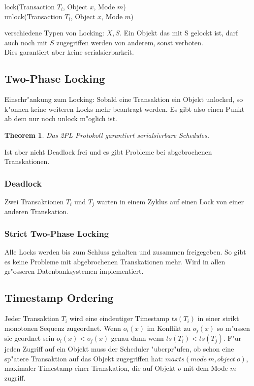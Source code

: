 \documentclass[german, 10pt, a4paper, twocolumn]{scrartcl}
\newtheorem{theorem}{Theorem}
\theoremstyle{definition}
\theoremstyle{remark}
\theoremstyle{example}
\begin{document}
lock(Transaction $T_i$, Object $x$, Mode $m$)\\
unlock(Transaction $T_i$, Object $x$, Mode $m$)

verschiedene Typen von Locking: $X, S$. Ein Objekt das mit S gelockt ist, darf auch noch mit $S$ zugegriffen werden von anderem, sonst verboten.\\

Dies garantiert aber keine serialsierbarkeit.

\subsection{Two-Phase Locking}

Einschr"ankung zum Locking: Sobald eine Transaktion ein Objekt unlocked, so k"onnen keine weiteren Locks mehr beantragt werden. Es gibt also einen Punkt ab dem nur noch unlock m"oglich ist.

\begin{theorem}
	Das 2PL Protokoll garantiert serialsierbare Schedules.
\end{theorem}

Ist aber nicht Deadlock frei und es gibt Probleme bei abgebrochenen Transkationen.

\subsubsection{Deadlock}

Zwei Transaktionen $T_i$ und $T_j$ warten in einem Zyklus auf einen Lock von einer anderen Transkation.

\subsubsection{Strict Two-Phase Locking}

Alle Locks werden bis zum Schluss gehalten und zusammen freigegeben. So gibt es keine Probleme mit abgebrochenen Transkationen mehr. Wird in allen gr"osseren Datenbanksystemen implementiert.

\subsection{Timestamp Ordering}

Jeder Transaktion $T_i$ wird eine eindeutiger Timestamp $ts(T_i)$ in einer strikt monotonen Sequenz zugeordnet. Wenn $o_i(x)$ im Konflikt zu $o_j(x)$ so m"ussen sie geordnet sein $o_i(x) < o_j(x)$ genau dann wenn $ts(T_i)< ts(T_j)$. F"ur jeden Zugriff auf ein Objekt muss der Scheduler "uberpr"ufen, ob schon eine sp"atere Transaktion auf das Objekt zugegriffen hat: $maxts(mode\ m, object \ o)$, maximaler Timestamp einer Transkation, die auf Objekt $o$ mit dem Mode $m$ zugriff.\\
\end{document}
